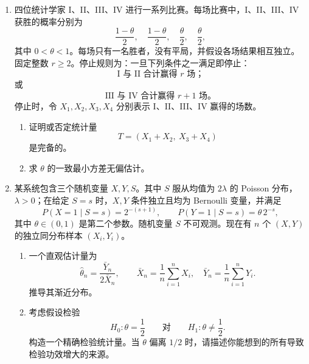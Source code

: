 \documentclass[UTF8,12pt]{ctexart}
\begin{document}
\begin{enumerate}[label=\textbf{\arabic*.},leftmargin=2.2em]
\item 四位统计学家 I、II、III、IV 进行一系列比赛。每场比赛中，I、II、III、IV 获胜的概率分别为
\[
\frac{1-\theta}{2},\quad \frac{1-\theta}{2},\quad \frac{\theta}{2},\quad \frac{\theta}{2},
\]
其中 \(0<\theta<1\)。每场只有一名胜者，没有平局，并假设各场结果相互独立。固定整数 \(r\ge2\)。停止规则为：一旦下列条件之一满足即停止：
\[
\text{I 与 II 合计赢得 } r \text{ 场；}
\]
或
\[
\text{III 与 IV 合计赢得 } r+1 \text{ 场。}
\]
停止时，令 \(X_1,X_2,X_3,X_4\) 分别表示 I、II、III、IV 赢得的场数。
\begin{enumerate}[label=\textbf{(\alph*)},leftmargin=2.4em]
\item 证明或否定统计量
\[
T=(X_1+X_2,\ X_3+X_4)
\]
是完备的。
\item 求 \(\theta\) 的一致最小方差无偏估计。
\end{enumerate}

\item 某系统包含三个随机变量 \(X,Y,S\)。其中 \(S\) 服从均值为 \(2\lambda\) 的 Poisson 分布，\(\lambda>0\)；在给定 \(S=s\) 时，\(X,Y\) 条件独立且均为 Bernoulli 变量，并满足
\[
P(X=1\mid S=s)=2^{-(s+1)},\qquad
P(Y=1\mid S=s)=\theta\,2^{-s},
\]
其中 \(\theta\in(0,1)\) 是第二个参数。随机变量 \(S\) 不可观测。现在有 \(n\) 个 \((X,Y)\) 的独立同分布样本 \((X_i,Y_i)\)。
\begin{enumerate}[label=\textbf{(\alph*)},leftmargin=2.4em]
\item 一个直观估计量为
\[
\hat\theta_n=\frac{\bar Y_n}{2\bar X_n},
\qquad
\bar X_n=\frac1n\sum_{i=1}^nX_i,\quad
\bar Y_n=\frac1n\sum_{i=1}^nY_i.
\]
推导其渐近分布。
\item 考虑假设检验
\[
H_0:\theta=\frac12\qquad \text{对}\qquad H_1:\theta\ne\frac12.
\]
构造一个精确检验统计量。当 \(\theta\) 偏离 \(1/2\) 时，请描述你能想到的所有导致检验功效增大的来源。
\end{enumerate}
\end{enumerate}
\end{document}
